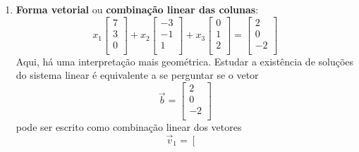 \documentclass[../livro.tex]{subfiles}  %
\begin{document}
\begin{enumerate}[1.]
\begin{equation}
\begin{array}{c}
	\end{array}
	\right]  \quad \text{ ou } \quad A \vec{x} = \vec{b}.
	\end{equation} Nesta forma, aparece o produto de uma matriz por um vetor. Depois podemos considerar produto de matrizes e a resolução de sistemas lineares concomitantemente (ver também capítulo da Semana 04). Caso a matriz $A$ acima seja invertível, sabemos que o sistema possui apenas uma solução e que
	\begin{equation}
	\vec{x} =  A^{-1} \vec{b}.
	\end{equation}
	\item  \textbf{Forma vetorial} ou \textbf{combinação linear das colunas}:
	\begin{equation}
	x_1 \left[
	\begin{array}{ccc}
	7   \\
	3   \\
	0   \\
	\end{array}
	\right] + x_2
	\left[
	\begin{array}{c}
	-3   \\
	-1   \\
	1   \\
	\end{array}
	\right] + x_3
	\left[
	\begin{array}{c}
	0  \\
	1  \\
	2  \\
	\end{array}
	\right] =
	\left[
	\begin{array}{c}
	2  \\
	0  \\
	-2  \\
	\end{array}
	\right]
	\end{equation} Aqui, há uma interpretação mais geométrica. Estudar a existência de soluções do sistema linear é equivalente a se perguntar se o vetor
	\begin{equation}
	\vec{b} =
	\left[
	\begin{array}{c}
	2  \\
	0  \\
	-2  \\
	\end{array}
	\right]
	\end{equation} pode ser escrito como combinação linear dos vetores
	\begin{equation}
	\vec{v}_1 = \left[
	\begin{array}{ccc}

\end{array}
\end{equation}
\end{enumerate}
\end{document}
